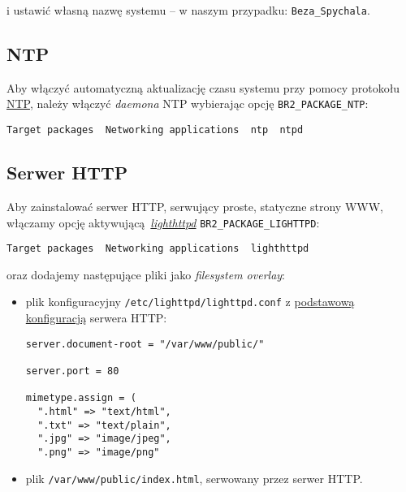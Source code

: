 \documentclass{article}
\begin{document}
\noindent i ustawić własną nazwę systemu -- w naszym przypadku: \texttt{Beza\_Spychala}.


\subsection{NTP}

Aby włączyć automatyczną aktualizację czasu systemu przy pomocy protokołu \href{http://www.ntp.org/rfc.html}{NTP}, należy włączyć \emph{daemona} NTP wybierając opcję \texttt{BR2\_PACKAGE\_NTP}:

\begin{center}
\texttt{Target packages \textrightarrow\ Networking applications \textrightarrow\ ntp \textrightarrow\ ntpd}
\end{center}


\subsection{Serwer HTTP}

Aby zainstalować serwer HTTP, serwujący proste, statyczne strony WWW, włączamy opcję aktywującą~\emph{\href{https://www.lighttpd.net/}{lighthttpd}} \texttt{BR2\_PACKAGE\_LIGHTTPD}:

\begin{center}
\texttt{Target packages \textrightarrow\ Networking applications \textrightarrow\ lighthttpd}
\end{center}

oraz dodajemy następujące pliki jako \emph{filesystem overlay}:
\begin{itemize}
\item plik konfiguracyjny \texttt{/etc/lighttpd/lighttpd.conf} z \href{https://redmine.lighttpd.net/projects/1/wiki/TutorialConfiguration}{podstawową konfiguracją} serwera HTTP:
\begin{Verbatim}[frame=single]
server.document-root = "/var/www/public/"

server.port = 80

mimetype.assign = (
  ".html" => "text/html",
  ".txt" => "text/plain",
  ".jpg" => "image/jpeg",
  ".png" => "image/png"
\end{Verbatim}
\item plik \texttt{/var/www/public/index.html}, serwowany przez serwer HTTP.
\end{itemize}
\end{document}
